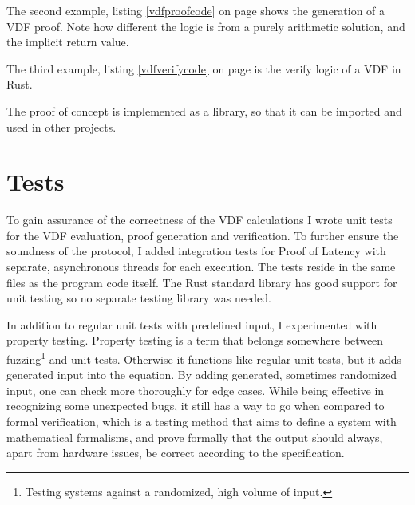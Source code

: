 The second example, listing \ref{vdfproofcode} on page \pageref{vdfproofcode} shows the generation of a VDF proof. Note how different the logic is from a purely arithmetic solution, and the implicit return value. 


The third example, listing \ref{vdfverifycode} on page \pageref{vdfverifycode} is the verify logic of a VDF in Rust.

The proof of concept is implemented as a library, so that it can be imported and used in other projects.

\section{Tests}
To gain assurance of the correctness of the VDF calculations I wrote unit tests for the VDF evaluation, proof generation and verification. To further ensure the soundness of the protocol, I added integration tests for Proof of Latency with separate, asynchronous threads for each execution. The tests reside in the same files as the program code itself. The Rust standard library has good support for unit testing so no separate testing library was needed.

In addition to regular unit tests with predefined input, I experimented with property testing. Property testing is a term that belongs somewhere between fuzzing\footnote{Testing systems against a randomized, high volume of input.} and unit tests. Otherwise it functions like regular unit tests, but it adds generated input into the equation. By adding generated, sometimes randomized input, one can check more thoroughly for edge cases. While being effective in recognizing some unexpected bugs, it still has a way to go when compared to formal verification, which is a testing method that aims to define a system with mathematical formalisms, and prove formally that the output should always, apart from hardware issues, be correct according to the specification.

